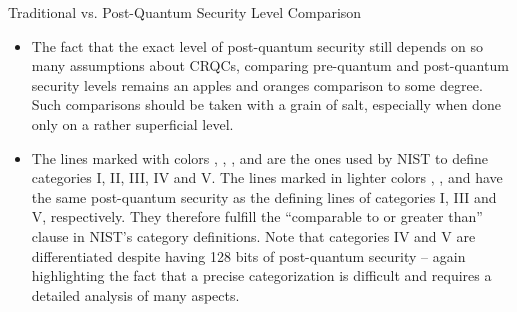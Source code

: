 \begin{algorithmbox}{Traditional vs. Post-Quantum Security Level Comparison}
\begin{itemize}
        \item The fact that the exact level of post-quantum security still depends on so many assumptions about CRQCs, comparing pre-quantum and post-quantum security levels remains an apples and oranges comparison to some degree. Such comparisons should be taken with a grain of salt, especially when done only on a rather superficial level.
        \item The lines marked with colors \textcolor{themered!50!black}{\blacksquare}, \textcolor{themered}{\blacksquare}, \textcolor{themeorange}{\blacksquare}, \textcolor{themeyellow}{\blacksquare} and \textcolor{themegreen!50}{\blacksquare}
        are the ones used by NIST to define categories I, II, III, IV and V. The lines marked in lighter colors
        \textcolor{themered!50!black!50}{\blacksquare}, \textcolor{themeorange!35}{\blacksquare}, and \textcolor{themegreen}{\blacksquare} have the same post-quantum security as the defining lines of categories I, III and V, respectively. They therefore fulfill the ``comparable to or greater than'' clause in NIST's category definitions. Note that categories IV and V are differentiated despite having 128 bits of post-quantum security -- again highlighting the fact that a precise categorization is difficult and requires a detailed analysis of many aspects.
    \end{itemize}
\end{algorithmbox}




